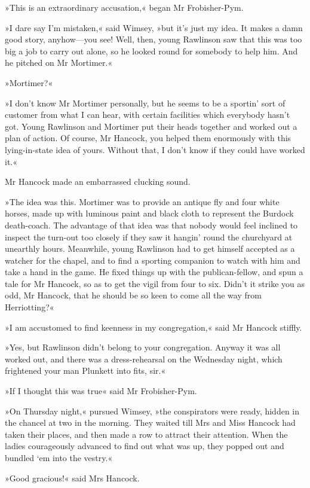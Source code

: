 »This is an extraordinary accusation,« began Mr Frobisher-Pym.

»I dare say I'm mistaken,« said Wimsey, »but it's just my idea. It makes a damn good story, anyhow—you see! Well, then, young Rawlinson saw that this was too big a job to carry out alone, so he looked round for somebody to help him. And he pitched on Mr Mortimer.«

»Mortimer?«

»I don't know Mr Mortimer personally, but he seems to be a sportin' sort of customer from what I can hear, with certain facilities which everybody hasn't got. Young Rawlinson and Mortimer put their heads together and worked out a plan of action. Of course, Mr Hancock, you helped them enormously with this lying-in-state idea of yours. Without that, I don't know if they could have worked it.«

Mr Hancock made an embarrassed clucking sound.

»The idea was this. Mortimer was to provide an antique fly and four white horses, made up with luminous paint and black cloth to represent the Burdock death-coach. The advantage of that idea was that nobody would feel inclined to inspect the turn-out too closely if they saw it hangin' round the churchyard at unearthly hours. Meanwhile, young Rawlinson had to get himself accepted as a watcher for the chapel, and to find a sporting companion to watch with him and take a hand in the game. He fixed things up with the publican-fellow, and spun a tale for Mr Hancock, so as to get the vigil from four to six. Didn't it strike you as odd, Mr Hancock, that he should be so keen to come all the way from Herriotting?«

»I am accustomed to find keenness in my congregation,« said Mr Hancock stiffly.

»Yes, but Rawlinson didn't belong to your congregation. Anyway it was all worked out, and there was a dress-rehearsal on the Wednesday night, which frightened your man Plunkett into fits, sir.«

»If I thought this was true\longdash« said Mr Frobisher-Pym.

»On Thursday night,« pursued Wimsey, »the conspirators were ready, hidden in the chancel at two in the morning. They waited till Mrs and Miss Hancock had taken their places, and then made a row to attract their attention. When the ladies courageously advanced to find out what was up, they popped out and bundled `em into the vestry.«

»Good gracious!« said Mrs Hancock.

